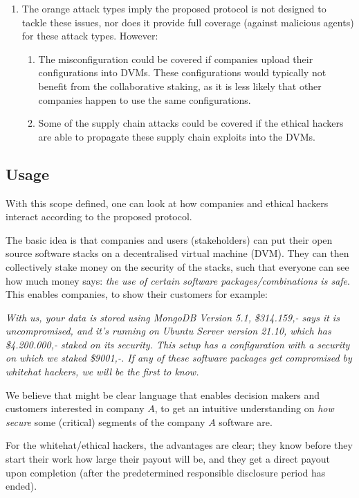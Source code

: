 \begin{enumerate} 
    \item The orange attack types imply the proposed protocol is not designed to tackle these issues, nor does it provide full coverage (against malicious agents) for these attack types. However:
    \begin{enumerate}
        \item The misconfiguration could be covered if companies upload their configurations into DVMs. These configurations would typically not benefit from the collaborative staking, as it is less likely that other companies happen to use the same configurations.
        \item Some of the supply chain attacks could be covered if the ethical hackers are able to propagate these supply chain exploits into the DVMs.
    \end{enumerate}
\end{enumerate}

\subsection{Usage}
\noindent With this scope defined, one can look at how companies and ethical hackers interact according to the proposed protocol.

The basic idea is that companies and users (stakeholders) can put their open source software stacks on a decentralised virtual machine (DVM). They can then collectively stake money on the security of the stacks, such that everyone can see how much money says: \textit{the use of certain software packages/combinations is safe}. This enables companies, to show their customers for example:

\textit{With us, your data is stored using MongoDB Version 5.1, \$314.159,- says it is uncompromised, and it's running on Ubuntu Server version 21.10, which has \$4.200.000,- staked on its security. This setup has a configuration with a security on which we staked \$9001,-. If any of these software packages get compromised by whitehat hackers, we will be the first to know.}

We believe that might be clear language that enables decision makers and customers interested in company $A$, to get an intuitive understanding on \textit{how secure} some (critical) segments of the company $A$ software are.

For the whitehat/ethical hackers, the advantages are clear; they know before they start their work how large their payout will be, and they get a direct payout upon completion (after the predetermined responsible disclosure period has ended).

